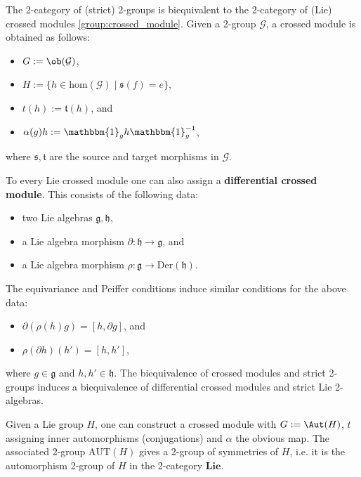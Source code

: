     \begin{property}
        The 2-category of (strict) 2-groups is biequivalent to the 2-category of (Lie) crossed modules \ref{group:crossed_module}. Given a 2-group $\mathcal{G}$, a crossed module is obtained as follows:
        \begin{itemize}
            \item $G:=\ob(\mathcal{G})$,
            \item $H:=\{h\in\mathrm{hom}(\mathcal{G})\mid\mathfrak{s}(f)=e\}$,
            \item $t(h):=\mathfrak{t}(h)$, and
            \item $\alpha(g)h := \mathbbm{1}_gh\mathbbm{1}_g^{-1}$,
        \end{itemize}
        where $\mathfrak{s},\mathfrak{t}$ are the source and target morphisms in $\mathcal{G}$.

        To every Lie crossed module one can also assign a \textbf{differential crossed module}. This consists of the following data:
        \begin{itemize}
            \item two Lie algebras $\mathfrak{g},\mathfrak{h}$,
            \item a Lie algebra morphism $\partial:\mathfrak{h}\rightarrow\mathfrak{g}$, and
            \item a Lie algebra morphism $\rho:\mathfrak{g}\rightarrow\text{Der}(\mathfrak{h})$.
        \end{itemize}
        The equivariance and Peiffer conditions induce similar conditions for the above data:
        \begin{itemize}
            \item $\partial(\rho(h)g) = [h,\partial g]$, and
            \item $\rho(\partial h)(h') = [h,h']$,
        \end{itemize}
        where $g\in\mathfrak{g}$ and $h,h'\in\mathfrak{h}$. The biequivalence of crossed modules and strict 2-groups induces a biequivalence of differential crossed modules and strict Lie 2-algebras.
    \end{property}

    \begin{example}
        Given a Lie group $H$, one can construct a crossed module with $G:=\Aut(H)$, $t$ assigning inner automorphisms (conjugations) and $\alpha$ the obvious map. The associated 2-group $\mathrm{AUT}(H)$ gives a 2-group of symmetries of $H$, i.e. it is the automorphism 2-group of $H$ in the 2-category $\mathbf{Lie}$.
    \end{example}

